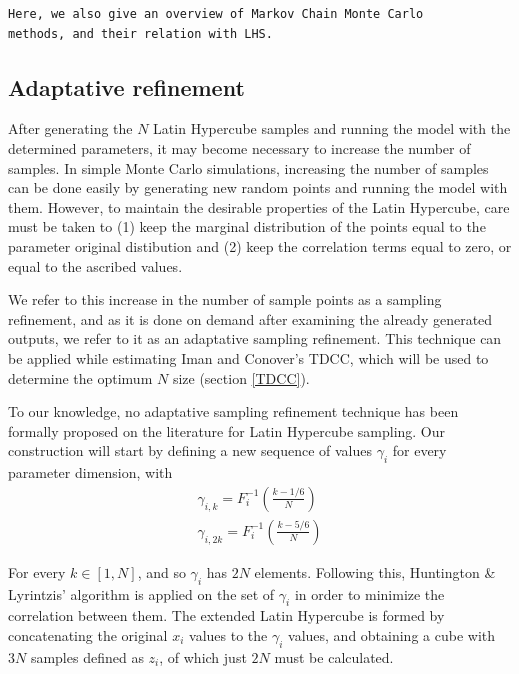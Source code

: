 \begin{verbatim}
Here, we also give an overview of Markov Chain Monte Carlo 
methods, and their relation with LHS. 
\end{verbatim}

\subsection{Adaptative refinement}
After generating the $N$ Latin Hypercube samples and running the model with
the determined parameters, it may become necessary to increase the number
of samples. In simple Monte Carlo simulations, increasing the number of samples
can be done easily by generating new random points and running the model with
them. However, to maintain the desirable properties of the Latin Hypercube,
care must be taken to (1) keep the marginal distribution of the points equal
to the parameter original distibution and (2) keep the correlation terms
equal to zero, or equal to the ascribed values. 

We refer to this increase in the number of sample points as a sampling
refinement, and as it is done on demand after examining the already 
generated outputs, we refer to it as an adaptative sampling refinement.
This technique can be applied while estimating Iman and Conover's TDCC,
which will be used to determine the optimum $N$ size (section \ref{TDCC}).

To our knowledge, no adaptative sampling refinement technique has been
formally proposed on the literature for Latin Hypercube sampling. 
Our construction will start by defining a new sequence of values $\gamma_i$
for every parameter dimension, with 
\begin{eqnarray}
	\gamma_{i,k} = F_i^{-1}\left( \frac{k-1/6}{N}\right) \\
	\gamma_{i,2k} = F_i^{-1}\left( \frac{k-5/6}{N}\right)
	\label{gamma}
\end{eqnarray}

For every $k \in [1,N]$, and so $\gamma_i$ has $2N$ elements. Following this,
Huntington \& Lyrintzis' algorithm \cite{Huntington98} is applied on the set of
$\gamma_i$ in order to minimize the correlation between them.
The extended Latin Hypercube is formed by concatenating the original $x_i$
values to the $\gamma_i$ values, and obtaining a cube with $3N$ samples
defined as $z_i$, of which just $2N$ must be calculated.


